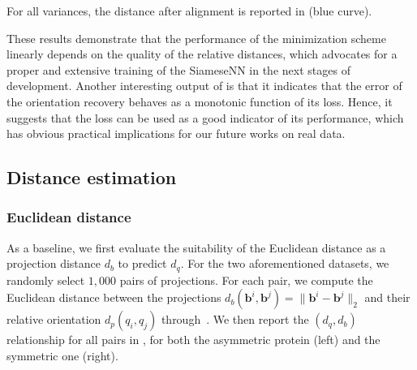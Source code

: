 For all variances, the distance after alignment is reported in  (blue curve).

These results demonstrate that the performance of the minimization scheme~ linearly depends on the quality of the relative distances, which advocates for a proper and extensive training of the SiameseNN in the next stages of development.
Another interesting output of  is that it indicates that the error of the orientation recovery behaves as a monotonic function of its loss.
Hence, it suggests that the loss can be used as a good indicator of its performance, which has obvious practical implications for our future works on real data.

\subsection{Distance estimation}\label{sec:results:distance-estimation}





\subsubsection{Euclidean distance}\label{sec:results:distance-estimation:euclidean}


As a baseline, we first evaluate the suitability of the Euclidean distance as a projection distance $d_b$ to predict $d_q$.
For the two aforementioned datasets, we randomly select $1,000$ pairs of projections.
For each pair, we compute the Euclidean distance between the projections $d_b(\mathbf{b}^i,\mathbf{b}^j)=\lVert\mathbf{b}^i-\mathbf{b}^j\rVert_2$ and their relative orientation $d_p(q_i,q_j)$ through~.
We then report the $(d_q,d_b)$ relationship for all pairs in , for both the asymmetric protein (left) and the symmetric one (right).

